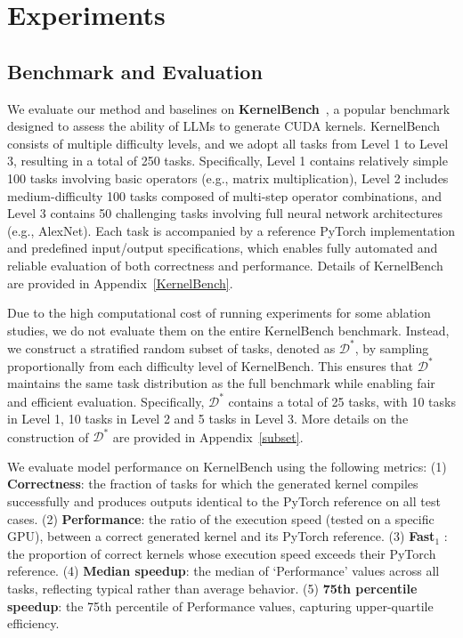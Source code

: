 \section{Experiments}\label{exp}
\subsection{Benchmark and Evaluation}
We evaluate our method and baselines on \textbf{KernelBench}~\citep{ouyang2025kernelbenchllmswriteefficient}, a popular benchmark designed to assess the ability of LLMs to generate CUDA kernels.  
KernelBench consists of multiple difficulty levels, and we adopt all tasks from Level 1 to Level 3, resulting in a total of 250 tasks.  
Specifically, Level 1 contains relatively simple 100 tasks involving basic operators (e.g., matrix multiplication),  
Level 2 includes medium-difficulty 100 tasks composed of multi-step operator combinations,  
and Level 3 contains 50 challenging tasks involving full neural network architectures (e.g., AlexNet).  
Each task is accompanied by a reference PyTorch implementation and predefined input/output specifications, which enables fully automated and reliable evaluation of both correctness and performance. Details of KernelBench are provided in Appendix~\ref{KernelBench}. 

Due to the high computational cost of running experiments for some ablation studies, we do not evaluate them on the entire KernelBench benchmark. 
Instead, we construct a {stratified random subset} of tasks, denoted as $\mathcal{D}^{*}$, by sampling proportionally from each difficulty level of KernelBench. This ensures that $\mathcal{D}^{*}$ maintains the same task distribution as the full benchmark while enabling fair and efficient evaluation. Specifically, $\mathcal{D}^{*}$ contains a total of 25 tasks, with 10 tasks in Level 1, 10 tasks in Level 2 and 5 tasks in Level 3. More details on the construction of $\mathcal{D}^{*}$ are provided in Appendix~\ref{subset}.


We evaluate model performance on KernelBench using the following metrics: (1) \textbf{Correctness}: the fraction of tasks for which the generated kernel compiles successfully and produces outputs identical to the PyTorch reference on all test cases. (2) \textbf{Performance}: the ratio of the execution speed (tested on a specific GPU), between a correct generated kernel and its PyTorch reference. 
(3) \textbf{Fast\(_1\)} : the proportion of correct kernels whose execution speed exceeds their PyTorch reference. 
(4) \textbf{Median speedup}: the median of `Performance' values across all tasks, reflecting typical rather than average behavior.
(5) \textbf{75th percentile speedup}: the 75th percentile of Performance values, capturing upper-quartile efficiency.


